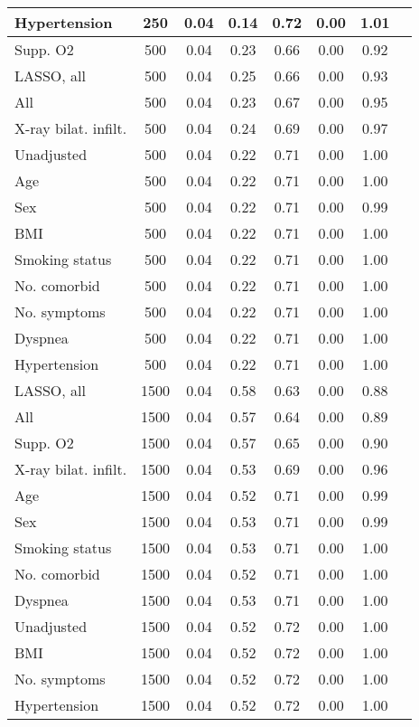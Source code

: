 \documentclass{article}
\begin{document}
{\begin{longtable}{lccccccc}
Hypertension & 250 & 0.04 & 0.14 & 0.72 & 0.00 & 1.01 \\ \midrule 
Supp. O2 & 500 & 0.04 & 0.23 & 0.66 & 0.00 & 0.92 \\ 
LASSO, all & 500 & 0.04 & 0.25 & 0.66 & 0.00 & 0.93 \\ 
All & 500 & 0.04 & 0.23 & 0.67 & 0.00 & 0.95 \\ 
X-ray bilat. infilt. & 500 & 0.04 & 0.24 & 0.69 & 0.00 & 0.97 \\ 
Unadjusted & 500 & 0.04 & 0.22 & 0.71 & 0.00 & 1.00 \\ 
Age & 500 & 0.04 & 0.22 & 0.71 & 0.00 & 1.00 \\ 
Sex & 500 & 0.04 & 0.22 & 0.71 & 0.00 & 0.99 \\ 
BMI & 500 & 0.04 & 0.22 & 0.71 & 0.00 & 1.00 \\ 
Smoking status & 500 & 0.04 & 0.22 & 0.71 & 0.00 & 1.00 \\ 
No. comorbid & 500 & 0.04 & 0.22 & 0.71 & 0.00 & 1.00 \\ 
No. symptoms & 500 & 0.04 & 0.22 & 0.71 & 0.00 & 1.00 \\ 
Dyspnea & 500 & 0.04 & 0.22 & 0.71 & 0.00 & 1.00 \\ 
Hypertension & 500 & 0.04 & 0.22 & 0.71 & 0.00 & 1.00 \\ \midrule 
LASSO, all & 1500 & 0.04 & 0.58 & 0.63 & 0.00 & 0.88 \\ 
All & 1500 & 0.04 & 0.57 & 0.64 & 0.00 & 0.89 \\ 
Supp. O2 & 1500 & 0.04 & 0.57 & 0.65 & 0.00 & 0.90 \\ 
X-ray bilat. infilt. & 1500 & 0.04 & 0.53 & 0.69 & 0.00 & 0.96 \\ 
Age & 1500 & 0.04 & 0.52 & 0.71 & 0.00 & 0.99 \\ 
Sex & 1500 & 0.04 & 0.53 & 0.71 & 0.00 & 0.99 \\ 
Smoking status & 1500 & 0.04 & 0.53 & 0.71 & 0.00 & 1.00 \\ 
No. comorbid & 1500 & 0.04 & 0.52 & 0.71 & 0.00 & 1.00 \\ 
Dyspnea & 1500 & 0.04 & 0.53 & 0.71 & 0.00 & 1.00 \\ 
Unadjusted & 1500 & 0.04 & 0.52 & 0.72 & 0.00 & 1.00 \\ 
BMI & 1500 & 0.04 & 0.52 & 0.72 & 0.00 & 1.00 \\ 
No. symptoms & 1500 & 0.04 & 0.52 & 0.72 & 0.00 & 1.00 \\ 
Hypertension & 1500 & 0.04 & 0.52 & 0.72 & 0.00 & 1.00 \\
\bottomrule
\hline
\end{longtable}
}
\end{document}
